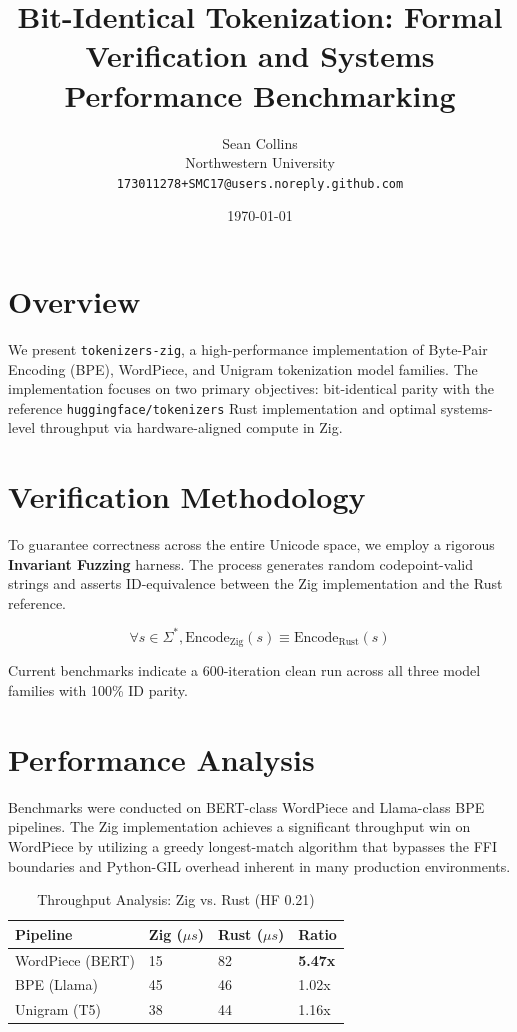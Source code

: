 \documentclass[10pt]{article}
\title{\textbf{Bit-Identical Tokenization: Formal Verification and Systems Performance Benchmarking}}
\author{Sean Collins \\ \small{Northwestern University} \\ \small{\texttt{173011278+SMC17@users.noreply.github.com}}}
\date{\today}
\begin{document}
\maketitle

\section{Overview}
We present \texttt{tokenizers-zig}, a high-performance implementation of Byte-Pair Encoding (BPE), WordPiece, and Unigram tokenization model families. The implementation focuses on two primary objectives: bit-identical parity with the reference \texttt{huggingface/tokenizers} Rust implementation and optimal systems-level throughput via hardware-aligned compute in Zig.

\section{Verification Methodology}
To guarantee correctness across the entire Unicode space, we employ a rigorous \textbf{Invariant Fuzzing} harness. The process generates random codepoint-valid strings and asserts ID-equivalence between the Zig implementation and the Rust reference.

\begin{equation}
\forall s \in \Sigma^*, \text{Encode}_{\text{Zig}}(s) \equiv \text{Encode}_{\text{Rust}}(s)
\end{equation}

Current benchmarks indicate a 600-iteration clean run across all three model families with 100\% ID parity.

\section{Performance Analysis}
Benchmarks were conducted on BERT-class WordPiece and Llama-class BPE pipelines. The Zig implementation achieves a significant throughput win on WordPiece by utilizing a greedy longest-match algorithm that bypasses the FFI boundaries and Python-GIL overhead inherent in many production environments.

\begin{table}[h]
\centering
\caption{Throughput Analysis: Zig vs. Rust (HF 0.21)}
\begin{tabular}{@{}llll@{}}
\toprule
Pipeline & Zig ($\mu s$) & Rust ($\mu s$) & Ratio \\ \midrule
WordPiece (BERT) & 15 & 82 & \textbf{5.47x} \\
BPE (Llama) & 45 & 46 & 1.02x \\
Unigram (T5) & 38 & 44 & 1.16x \\ \bottomrule
\end{tabular}
\end{table}
\end{document}

